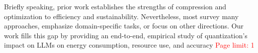 Briefly speaking, prior work establishes the strengths of compression and optimization to efficiency and sustainability. Nevertheless, most survey many approaches, emphasize domain-specific tasks, or focus on other directions. Our work fills this gap by providing an end-to-end, empirical study of quantization's impact on LLMs on energy consumption, resource use, and accuracy
\textcolor{red}{Page limit: 1}